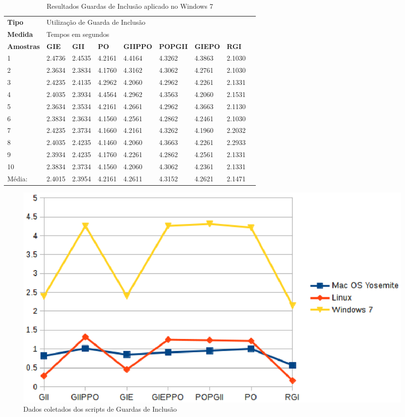\begin{table}[!ht]
\centering
\caption{Resultados Guardas de Inclusão aplicado no Windows 7}
\label{tab:resutados_guards_de_inclusao:windows7}
\begin{tiny}
\begin{tabular}{lp{1cm}p{1cm}p{1cm}p{1cm}p{1cm}p{1cm}p{1cm}p{1cm}}
\textbf{Tipo} & \multicolumn{7}{l}{Utilização de Guarda de Inclusão} \\
\textbf{Medida} & \multicolumn{7}{l}{Tempos em segundos } \\
\textbf{Amostras} & \textbf{GIE} & \textbf{GII} & \textbf{PO} & 
\textbf{GIIPPO} & \textbf{POPGII} & \textbf{GIEPO} & \textbf{RGI} \\ \toprule
 1      & 2.4736 & 2.4535 & 4.2161 & 4.4164 & 4.3262 & 4.3863  & 2.1030 \\ 
 2      & 2.3634 & 2.3834 & 4.1760 & 4.3162 & 4.3062 & 4.2761  & 2.1030 \\ 
 3      & 2.4235 & 2.4135 & 4.2962 & 4.2060 & 4.2962 & 4.2261  & 2.1331 \\ 
 4      & 2.4035 & 2.3934 & 4.4564 & 4.2962 & 4.3563 & 4.2060  & 2.1531 \\ 
 5      & 2.3634 & 2.3534 & 4.2161 & 4.2661 & 4.2962 & 4.3663  & 2.1130 \\ 
 6      & 2.3834 & 2.3634 & 4.1560 & 4.2561 & 4.2862 & 4.2461  & 2.1030 \\ 
 7      & 2.4235 & 2.3734 & 4.1660 & 4.2161 & 4.3262 & 4.1960  & 2.2032 \\ 
 8      & 2.4035 & 2.4235 & 4.1460 & 4.2060 & 4.3663 & 4.2261  & 2.2933 \\ 
 9      & 2.3934 & 2.4235 & 4.1760 & 4.2261 & 4.2862 & 4.2561  & 2.1331 \\ 
 10     & 2.3834 & 2.3734 & 4.1560 & 4.2060 & 4.3062 & 4.2361  & 2.1331 \\ \bottomrule 
 Média: & 2.4015 & 2.3954 & 4.2161 & 4.2611 & 4.3152 & 4.2621  & 2.1471 \\
\end{tabular}
\end{tiny}
\end{table}

\begin{figure}[!h]
    \centering
        \includegraphics{figuras/graficos/benchmark.eps}
    \caption{Dados coletados dos scripts de Guardas de Inclusão}
    \label{benchmark_guardas_de_inclusao}
\end{figure}

